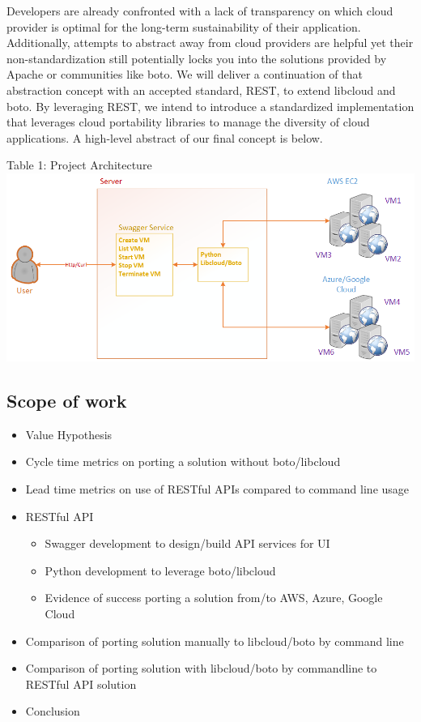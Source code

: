 Developers are already confronted with a lack of transparency on which
cloud provider is optimal for the long-term sustainability of their
application. Additionally, attempts to abstract away from cloud
providers are helpful yet their non-standardization still potentially
locks you into the solutions provided by Apache or communities like
boto. We will deliver a continuation of that abstraction concept with an
accepted standard, REST, to extend libcloud and boto. By leveraging
REST, we intend to introduce a standardized implementation that
leverages cloud portability libraries to manage the diversity of cloud
applications. A high-level abstract of our final concept is below.

Table 1: Project Architecture \includegraphics{images/proj-arch.png}

\subsection{Scope of work}\label{scope-of-work}

\begin{itemize}
\item
  Value Hypothesis
\item
  Cycle time metrics on porting a solution without boto/libcloud
\item
  Lead time metrics on use of RESTful APIs compared to command line
  usage
\item
  RESTful API

  \begin{itemize}
    \item
    Swagger development to design/build API services for UI
  \item
    Python development to leverage boto/libcloud
  \item
    Evidence of success porting a solution from/to AWS, Azure, Google
    Cloud
  \end{itemize}
\item
  Comparison of porting solution manually to libcloud/boto by command
  line
\item
  Comparison of porting solution with libcloud/boto by commandline to
  RESTful API solution
\item
  Conclusion
\end{itemize}

